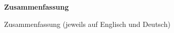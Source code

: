 \begin{center}
	\Large\bfseries{Zusammenfassung}
\end{center}
Zusammenfassung (jeweils auf Englisch und Deutsch)